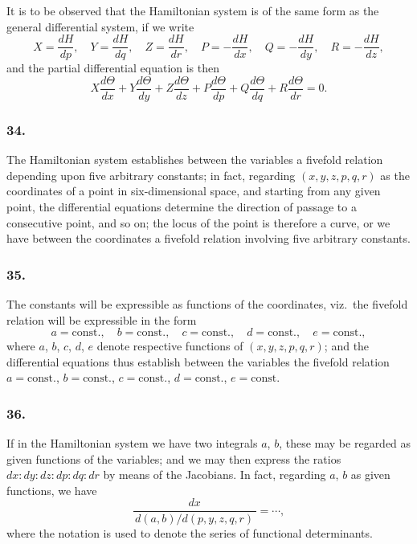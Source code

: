 \documentclass[12pt,a4paper]{article}
\theoremstyle{plain}
\begin{document}
It is to be observed that the Hamiltonian system is of the same form as the general differential system, if we write
\[
X = \frac{dH}{dp}, \quad Y = \frac{dH}{dq}, \quad Z = \frac{dH}{dr}, \quad
P = -\frac{dH}{dx}, \quad Q = -\frac{dH}{dy}, \quad R = -\frac{dH}{dz},
\]
and the partial differential equation is then
\[
X\frac{d\Theta}{dx} + Y\frac{d\Theta}{dy} + Z\frac{d\Theta}{dz} + P\frac{d\Theta}{dp} + Q\frac{d\Theta}{dq} + R\frac{d\Theta}{dr} = 0.
\]

\subsubsection*{34.}

The Hamiltonian system establishes between the variables a fivefold relation depending upon five arbitrary constants; in fact, regarding $(x, y, z, p, q, r)$ as the coordinates of a point in six-dimensional space, and starting from any given point, the differential equations determine the direction of passage to a consecutive point, and so on; the locus of the point is therefore a curve, or we have between the coordinates a fivefold relation involving five arbitrary constants.

\subsubsection*{35.}

The constants will be expressible as functions of the coordinates, viz.~the fivefold relation will be expressible in the form
\[
a = \text{const.}, \quad b = \text{const.}, \quad c = \text{const.}, \quad d = \text{const.}, \quad e = \text{const.},
\]
where $a$, $b$, $c$, $d$, $e$ denote respective functions of $(x, y, z, p, q, r)$; and the differential equations thus establish between the variables the fivefold relation $a = \text{const.}$, $b = \text{const.}$, $c = \text{const.}$, $d = \text{const.}$, $e = \text{const.}$

\subsubsection*{36.}

If in the Hamiltonian system we have two integrals $a$, $b$, these may be regarded as given functions of the variables; and we may then express the ratios $dx : dy : dz : dp : dq : dr$ by means of the Jacobians. In fact, regarding $a$, $b$ as given functions, we have
\[
\frac{dx}{\,d(a, b)/d(p, y, z, q, r)\,} = \cdots,
\]
where the notation is used to denote the series of functional determinants.
\end{document}
